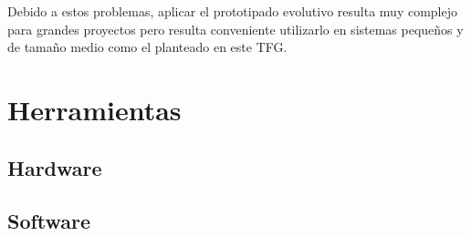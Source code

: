 Debido a estos problemas, aplicar el prototipado evolutivo resulta muy complejo para grandes
proyectos pero resulta conveniente utilizarlo en sistemas pequeños y de tamaño medio como el planteado en este \acs{TFG}.

\section{Herramientas}

\subsection{Hardware}
\begin{definitionlist}
  \item[]
\end{definitionlist}

\subsection{Software}

